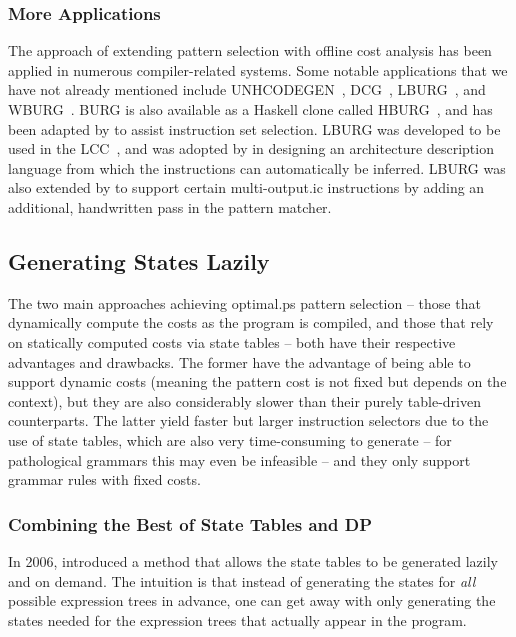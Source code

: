 {\subsubsection{More Applications}

The approach of extending \gls{pattern selection} with \gls{offline cost
  analysis} has been applied in numerous \gls{compiler}-related systems.
%
Some
notable applications that we have not already mentioned include
\gls{UNHCODEGEN}~\cite{Hatcher1988}, \gls{DCG}~\cite{Engler1994},
\gls{LBURG}~\cite{Hanson1995}, and \gls{WBURG}~\cite{Proebsting1996}.
%
\Gls{BURG}
is also available as a Haskell clone called \gls{HBURG}~\cite{HBURG}, and has
been adapted by \textcite{Boulytchev2007} to assist \gls{instruction set}
selection.
%
 \gls{LBURG} was developed to be used in the
\gls{LCC}~\cite{Hanson1995}, and was adopted by \textcite{Brandner2007} in
designing an architecture description language from which the
\glspl{instruction} can automatically be inferred.
%
\gls{LBURG} was also extended by \textcite{Farfeleder2006} to support certain
\gls{multi-output.ic} \glspl{instruction} by adding an additional, handwritten
pass in the \gls{pattern matcher}.


\subsection{Generating States Lazily}

The two main approaches achieving \gls{optimal.ps} \gls{pattern
  selection} -- those that dynamically compute the costs as the \gls{program} is
compiled, and those that rely on statically computed costs via \gls{state}
tables -- both have their respective advantages and drawbacks.
%
The former have
the advantage of being able to support dynamic costs (meaning the \gls{pattern}
cost is not fixed but depends on the context), but they are also considerably
slower than their purely table-driven counterparts.
%
The latter yield faster but
larger \glspl{instruction selector} due to the use of \gls{state} tables, which
are also very time-consuming to generate -- for pathological \glspl{grammar} this
may even be infeasible -- and they only support \gls{grammar} \glspl{rule} with
fixed costs.


\subsubsection{Combining the Best of State Tables and DP}

In 2006, \textcite{Ertl2006} introduced a method that allows the \gls{state}
tables to be generated lazily and on demand.
%
The intuition is that instead of
generating the \glspl{state} for \emph{all} possible \glspl{expression tree} in
advance, one can get away with only generating the \glspl{state} needed for
the \glspl{expression tree} that actually appear in the \gls{program}.

}
